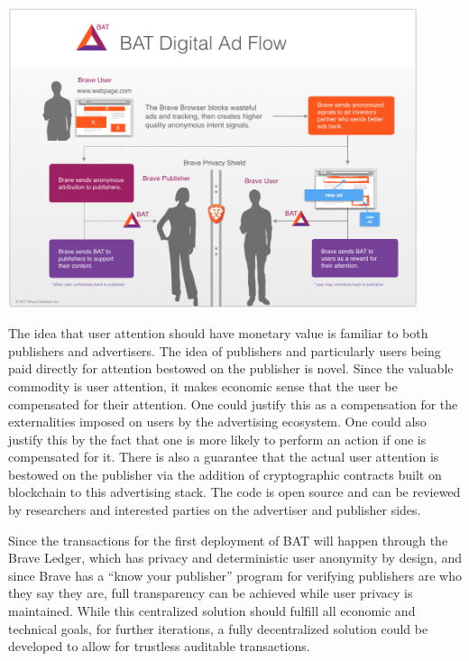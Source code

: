 \documentclass[11pt]{article}
\begin{document}
\begin{center}
\includegraphics[width=0.9\textwidth]{BAT_digital_ad_flow.png}
\end{center}

The idea that user attention should have monetary value is familiar to
both publishers and advertisers. The idea of publishers and
particularly users being paid directly for attention bestowed on the
publisher is novel. Since the valuable commodity is user attention, it
makes economic sense that the user be compensated for their
attention. One could justify this as a compensation for the
externalities imposed on users by the advertising ecosystem. One could
also justify this by the fact that one is more likely to perform an
action if one is compensated for it. There is also a guarantee that
the actual user attention is bestowed on the publisher via the
addition of cryptographic contracts built on blockchain to this
advertising stack.  The code is open source and can be reviewed by
researchers and interested parties on the advertiser and publisher sides.

Since the transactions for the first deployment of BAT will happen
through the Brave Ledger, which has privacy and deterministic user
anonymity by design, and since Brave has a “know your publisher”
program for verifying publishers are who they say they are, full
transparency can be achieved while user privacy is maintained. While this 
centralized solution should fulfill all economic and technical goals, for further iterations, a fully
decentralized solution could be developed to allow for trustless
auditable transactions.
\end{document}
